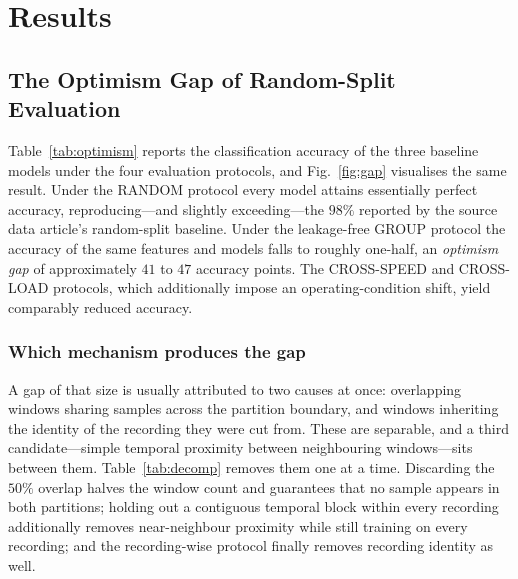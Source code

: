 \providecommand{\cmark}{\ding{51}}
\providecommand{\xmark}{\ding{55}}

\section{Results}
\label{sec:results}

\subsection{The Optimism Gap of Random-Split Evaluation}
\label{subsec:gap}
Table~\ref{tab:optimism} reports the classification accuracy of the three
baseline models under the four evaluation protocols, and Fig.~\ref{fig:gap}
visualises the same result. Under the RANDOM protocol every model attains
essentially perfect accuracy, reproducing---and slightly exceeding---the $98\%$
reported by the source data article's random-split baseline. Under the
leakage-free GROUP protocol the accuracy of the same features and models falls to
roughly one-half, an \emph{optimism gap} of approximately $41$ to $47$ accuracy
points. The CROSS-SPEED and CROSS-LOAD protocols, which additionally impose an
operating-condition shift, yield comparably reduced accuracy.

\subsubsection{Which mechanism produces the gap}
\label{subsec:decomp}
A gap of that size is usually attributed to two causes at once: overlapping
windows sharing samples across the partition boundary, and windows inheriting the
identity of the recording they were cut from. These are separable, and a third
candidate---simple temporal proximity between neighbouring windows---sits between
them. Table~\ref{tab:decomp} removes them one at a time. Discarding the $50\%$
overlap halves the window count and guarantees that no sample appears in both
partitions; holding out a contiguous temporal block within every recording
additionally removes near-neighbour proximity while still training on every
recording; and the recording-wise protocol finally removes recording identity as
well.

